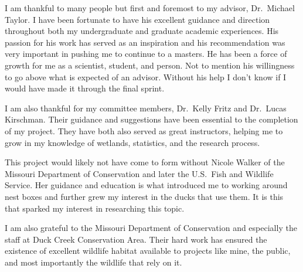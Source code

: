
I am thankful to many people but first and foremost to my advisor, Dr.~Michael Taylor. I have been fortunate to have his excellent guidance and direction throughout both my undergraduate and graduate academic experiences. His passion for his work has served as an inspiration and his recommendation was very important in pushing me to continue to a masters. He has been a force of growth for me as a scientist, student, and person. Not to mention his willingness to go above what is expected of an advisor. Without his help I don’t know if I would have made it through the final sprint. 

I am also thankful for my committee members, Dr.~Kelly Fritz and Dr.~Lucas Kirschman. Their guidance and suggestions have been essential to the completion of my project. They have both also served as great instructors, helping me to grow in my knowledge of wetlands, statistics, and the research process.  

This project would likely not have come to form without Nicole Walker of the Missouri Department of Conservation and later the U.S.~Fish and Wildlife Service. Her guidance and education is what introduced me to working around nest boxes and further grew my interest in the ducks that use them. It is this that sparked my interest in researching this topic. 

I am also grateful to the Missouri Department of Conservation and especially the staff at Duck Creek Conservation Area. Their hard work has ensured the existence of excellent wildlife habitat available to projects like mine, the public, and most importantly the wildlife that rely on it.  